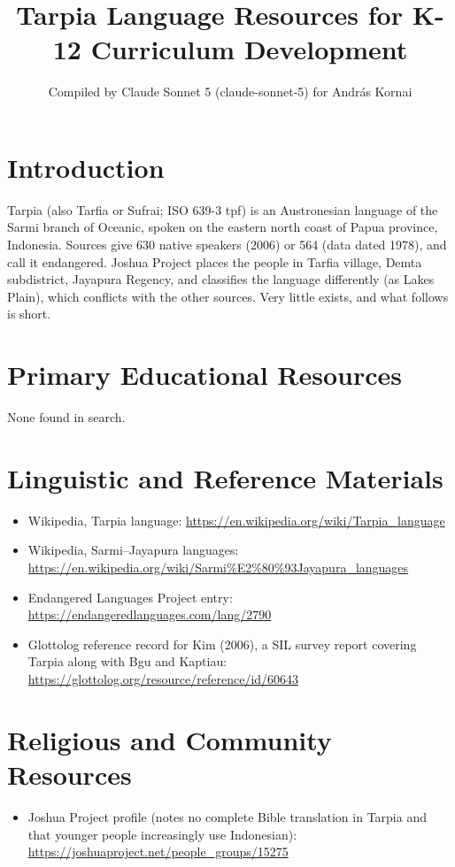 \documentclass[12pt]{article}
\title{Tarpia Language Resources for K-12 Curriculum Development}
\author{Compiled by Claude Sonnet 5 (claude-sonnet-5) for Andr\'as Kornai}
\date{}
\begin{document}
\maketitle

\section{Introduction}
Tarpia (also Tarfia or Sufrai; ISO 639-3 tpf) is an Austronesian language of the Sarmi branch of Oceanic, spoken on the eastern north coast of Papua province, Indonesia. Sources give 630 native speakers (2006) or 564 (data dated 1978), and call it endangered. Joshua Project places the people in Tarfia village, Demta subdistrict, Jayapura Regency, and classifies the language differently (as Lakes Plain), which conflicts with the other sources. Very little exists, and what follows is short.

\section{Primary Educational Resources}
None found in search.

\section{Linguistic and Reference Materials}
\begin{itemize}
\item Wikipedia, Tarpia language: \url{https://en.wikipedia.org/wiki/Tarpia_language}
\item Wikipedia, Sarmi--Jayapura languages: \url{https://en.wikipedia.org/wiki/Sarmi%E2%80%93Jayapura_languages}
\item Endangered Languages Project entry: \url{https://endangeredlanguages.com/lang/2790}
\item Glottolog reference record for Kim (2006), a SIL survey report covering Tarpia along with Bgu and Kaptiau: \url{https://glottolog.org/resource/reference/id/60643}
\end{itemize}

\section{Religious and Community Resources}
\begin{itemize}
\item Joshua Project profile (notes no complete Bible translation in Tarpia and that younger people increasingly use Indonesian): \url{https://joshuaproject.net/people_groups/15275}
\end{itemize}
\end{document}
